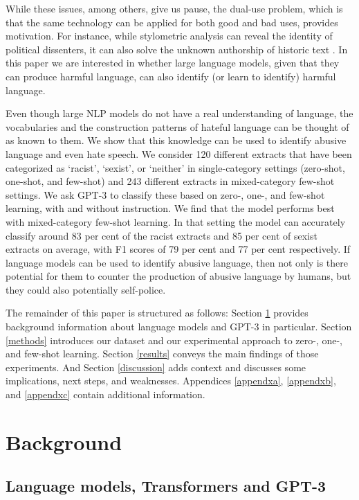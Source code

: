 \documentclass[12pt,]{article}
\begin{document}
While these issues, among others, give us pause, the dual-use problem, which is that the same technology can be applied for both good and bad uses, provides motivation. For instance, while stylometric analysis can reveal the identity of political dissenters, it can also solve the unknown authorship of historic text \citep{hovy2016social}. In this paper we are interested in whether large language models, given that they can produce harmful language, can also identify (or learn to identify) harmful language.

Even though large NLP models do not have a real understanding of language, the vocabularies and the construction patterns of hateful language can be thought of as known to them. We show that this knowledge can be used to identify abusive language and even hate speech. We consider 120 different extracts that have been categorized as `racist', `sexist', or `neither' in single-category settings (zero-shot, one-shot, and few-shot) and 243 different extracts in mixed-category few-shot settings. We ask GPT-3 to classify these based on zero-, one-, and few-shot learning, with and without instruction. We find that the model performs best with mixed-category few-shot learning. In that setting the model can accurately classify around 83 per cent of the racist extracts and 85 per cent of sexist extracts on average, with F1 scores of 79 per cent and 77 per cent respectively. If language models can be used to identify abusive language, then not only is there potential for them to counter the production of abusive language by humans, but they could also potentially self-police.

The remainder of this paper is structured as follows: Section \ref{background} provides background information about language models and GPT-3 in particular. Section \ref{methods} introduces our dataset and our experimental approach to zero-, one-, and few-shot learning. Section \ref{results} conveys the main findings of those experiments. And Section \ref{discussion} adds context and discusses some implications, next steps, and weaknesses. Appendices \ref{appendxa}, \ref{appendxb}, and \ref{appendxc} contain additional information.

\hypertarget{background}{%
\section{Background}\label{background}}

\hypertarget{language-models-transformers-and-gpt-3}{%
\subsection{Language models, Transformers and GPT-3}\label{language-models-transformers-and-gpt-3}}
\end{document}
